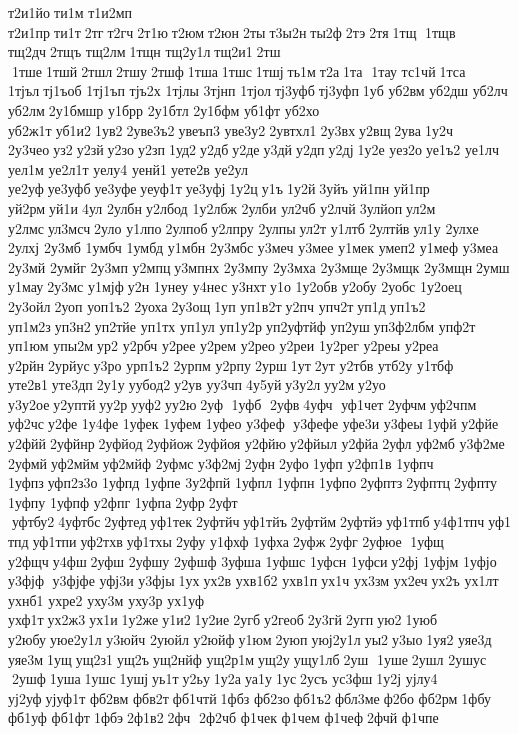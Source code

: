 т2и1йо ти1м 
т1и2мп 
т2и1пр ти1т 2тг т2гч 2т1ю т2юм т2юн 2ты т3ы2н ты2ф 2тэ 2тя 1тщ  1тщв 	тщ2дч 2тщъ 	тщ2лм 1тщн 
тщ2у1л тщ2и1 2тш  1тше 1тшй 2тшл 2тшу 2тшф 1тша 1тшс 1тшј ть1м т2а 1та  1тау 	тс1чй 1тса 	1тјъл тј1ъоб 
1тј1ъп 	тјъ2х 	1тјлы 	3тјнп 	1тјол тј3уфб тј3уфп 1уб 	уб2вм 	уб2дш 	уб2лч 	уб2лм 2у1бмшр 	у1брр 
2у1бтл 
2у1бфм 	уб1фт 	уб2хо 
уб2ж1т уб1и2 1ув2 2уве3ъ2 увеъп3 
уве3у2 2увтхл1 2у3вх у2вщ 2ува 1у2ч 
2у3чео уз2 у2зй у2зо у2зп 1уд2 у2дб у2де у3дй у2дп у2дј 1у2е 	уез2о уе1ъ2 	уе1лч 	уел1м 
уе2л1т 	уелу4 	уенй1 уете2в 	уе2ул 	уе2уф уе3уфб уе3уфе уеуф1т уе3уфј 1у2ц у1ъ 1у2й 3уйъ 	уй1пн 	уй1пр 	уй2рм уй1и 4ул  	2улбн у2лбод 
1у2лбж 	2улби 	ул2чб 	у2лчй 3улйоп ул2м 	у2лмс ул3мсч 2уло 	у1лпо 2улпоб у2лпру 	2улпы ул2т 	у1лтб 2ултйв ул1у 	2улхе 	2улхј 	2у3мб  	1умбч 	1умбд 	у1мбн 
2у3мбс 	у3меч 	у3мее 	у1мек 	умеп2 	у1меф 	у3меа 	2у3мй  	2умйг 	2у3мп  	у2мпц у3мпнх 
2у3мпу 
2у3мха 
2у3мще 
2у3мщк 
2у3мщн 2умш 	у1мау 2у3мс 	у1мјф у2н 	1унеу 	у4нес 	у3нхт у1о 
1у2обв 	у2обу 	2уобс 
1у2оец 
2у3ойл 2уоп 
уоп1ъ2 	2уоха 2у3ощ 1уп 
уп1в2т у2пч 	упч2т уп1д уп1ъ2 
уп1м2з уп3н2 уп2тйе 	уп1тх 	уп1ул 
уп1у2р уп2уфтйф 	уп2уш уп3ф2лбм 	упф2т 	уп1юм 	упы2м ур2 	у2рбч 	у2рее 	у2рем 	у2рео 	у2реи 
1у2рег 	у2реы 	у2реа 	у2рйн 2урйус у3ро 
урп1ъ2 	2урпм 	у2рпу 2урш 1ут 2ут  	у2тбв 	утб2у 	у1тбф 
уте2в1 уте3дп 2у1у уубод2 у2ув 	уу3чп 4у5уй у3у2л уу2м у2уо 
у3у2ое у2уптй уу2р ууф2 уу2ю 2уф  1уфб  2уфв 4уфч  уф1чет 	2уфчм уф2чпм 	уф2чс у2фе 	1у4фе  	1уфек 	1уфем 
1уфео  
у3феф  у3фефе 	уфе3и 	у3феы 1уфй 	у2фйе 	у2фйй 2уфйнр 2уфйод 2уфйож 2уфйоя 	у2фйю у2фйыл 	у2фйа 2уфл 	уф2мб 
у3ф2ме 	2уфмй уф2мйм уф2мйф 	2уфмс 
у3ф2мј 2уфн 2уфо 1уфп  
у2фп1в 	1уфпч 	1уфпз уфп2з3о 	1уфпд 	1уфпе 
3у2фпй 	1уфпл 	1уфпн 	1уфпо 2уфптз 2уфптц 2уфпту 	1уфпу 	1уфпф 	у2фпг 	1уфпа 2уфр 2уфт  уфтбу2 4уфтбс 2уфтед уф1тек 2уфтйч уф1тйъ 2уфтйм 2уфтйэ уф1тпб у4ф1тпч уф1тпд уф1тпи уф2тхв уф1тхы 2уфу 	у1фхф 	1уфха 2уфж 2уфг 
2уфюе  1уфщ 	у2фщч у4фш 2уфш  	2уфшу 	2уфшф 	3уфша 	1уфшс 	1уфсн 	1уфси у2фј 	1уфјм 
1уфјо  
у3фјф  у3фјфе 	уфј3и 	у3фјы 1ух ух2в 
ухв1б2 	ухв1п ух1ч 	ух3зм 	ух2еч ух2ъ 	ух1лт 	ухнб1 	ухре2 	уху3м 	уху3р 	ух1уф 	ухф1т ух2ж3 ух1и 1у2же у1и2 1у2ие 2угб у2геоб 2у3гй 2угп ую2 1уюб 	у2юбу уюе2у1л 	у3юйч 	2уюйл 	у2юйф у1юм 2уюп уюј2у1л уы2 у3ыо 1уя2 	уяе3д 	уяе3м 1ущ ущ2з1 ущ2ъ ущ2нйф 
ущ2р1м ущ2у ущу1лб 2уш  1уше 2ушл 
2ушус  2ушф 1уша 1ушс 1ушј уь1т у2ьу 1у2а уа1у 1ус 2усъ 	ус3фш 1у2ј 	ујлу4 	уј2уф ујуф1т 	фб2вм 	фбв2т фб1чтй 1фбз 	фб2зо фб1ъ2 фбл3ме ф2бо 	фб2рм 1фбу 	фб1уф 	фб1фт 1фбэ 2ф1в2 2фч  2ф2чб 	ф1чек 	ф1чем 	ф1чеф 2фчй 	ф1чпе 
